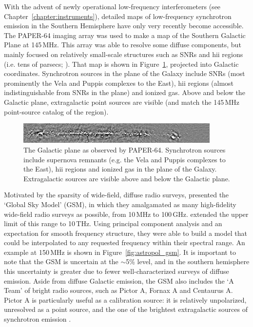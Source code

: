 With the advent of newly operational low-frequency interferometers (see Chapter~\ref{chapter:instruments}), detailed maps of low-frequency synchrotron emission in the Southern Hemisphere have only very recently become accessible. 
The PAPER-64 imaging array \citep[][and Chapter~\ref{chapter:instruments}]{Jacobs.11, Jacobs.13, Stefan.13} was used to make a map of the Southern Galactic Plane at 145\,MHz. This array was able to resolve some diffuse components, but mainly focused on relatively small-scale structures such as SNRs and {\sc hii} regions (i.e. tens of parsecs; \citealt{Asvarov.14}). That map is shown in Figure~\ref{fig:astropol_galplane_paper}, projected into Galactic coordinates. Synchrotron sources in the plane of the Galaxy include SNRs (most prominently the Vela and Puppis complexes to the East), {\sc hii} regions (almost indistinguishable from SNRs in the plane) and ionized gas. Above and below the Galactic plane, extragalactic point sources are visible (and match the \cite{Jacobs.11} 145\,MHz point-source catalog of the region).

\begin{figure}
\centering
\includegraphics[width=0.9\textwidth]{chapters/astropol/figures/galplane_linscale.png}
\caption[The Southern Galactic Plane as observed by PAPER-64 at 145\,MHz.]{The Galactic plane as observed by PAPER-64. Synchrotron sources include supernova remnants (e.g. the Vela and Puppis complexes to the East), {\sc hii} regions and ionized gas in the plane of the Galaxy. Extragalactic sources are visible above and below the Galactic plane.}
\label{fig:astropol_galplane_paper}
\end{figure}
Motivated by the sparsity of wide-field, diffuse radio surveys, \cite{GSM.08} presented the `Global Sky Model' (GSM), in which they amalgamated as many high-fidelity wide-field radio surveys as possible, from 10\,MHz to 100\,GHz. \cite{GSM.17} extended the upper limit of this range to 10\,THz. Using principal component analysis and an expectation for smooth frequency structure, they were able to build a model that could be interpolated to any requested frequency within their spectral range. An example at 150\,MHz is shown in Figure~\ref{fig:astropol_gsm}. It is important to note that the GSM is uncertain at the $\sim$5\% level, and in the southern hemisphere this uncertainty is greater due to fewer well-characterized surveys of diffuse emission. Aside from diffuse Galactic emission, the GSM also includes the `A Team' of bright radio sources, such as Pictor A, Fornax A and Centaurus A. Pictor A is particularly useful as a calibration source: it is relatively unpolarized, unresolved as a point source, and the one of the brightest extragalactic sources of synchrotron emission \citep{Jacobs.13}.

